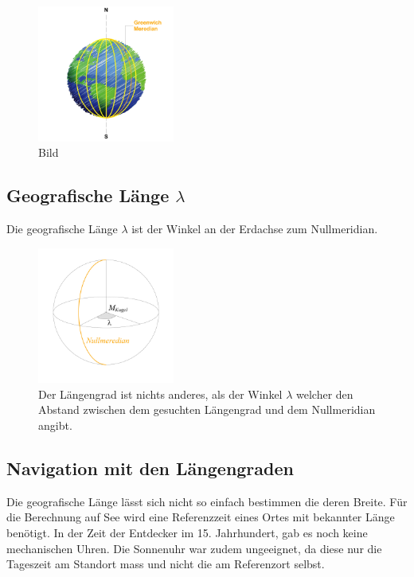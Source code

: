 \begin{refsection}
\begin{figure}[htbp]
\centering
\includegraphics[width=0.4\textwidth]{kugel/Laengengrad.jpg}
\caption{Bild}
\end{figure}


\subsection{Geografische Länge $\lambda$}
\begin{definition}
Die geografische Länge $\lambda$ ist der Winkel an der Erdachse zum Nullmeridian.
\end{definition}

\begin{figure}[htbp]
\centering
\includegraphics[width=0.4\textwidth]{kugel/GeografischeLaenge.jpg}
\caption{Der Längengrad ist nichts anderes, als der Winkel $\lambda$  welcher den Abstand zwischen dem gesuchten Längengrad und dem Nullmeridian angibt.}
\end{figure}

\subsection{Navigation mit den Längengraden}
Die geografische Länge lässt sich nicht so einfach bestimmen die deren Breite.
Für die Berechnung auf See wird eine Referenzzeit eines Ortes mit bekannter Länge benötigt.
In der Zeit der Entdecker im 15. Jahrhundert, gab es noch keine mechanischen Uhren. Die Sonnenuhr war zudem ungeeignet, da diese nur die Tageszeit am Standort mass und nicht die am Referenzort selbst.


\end{refsection}
